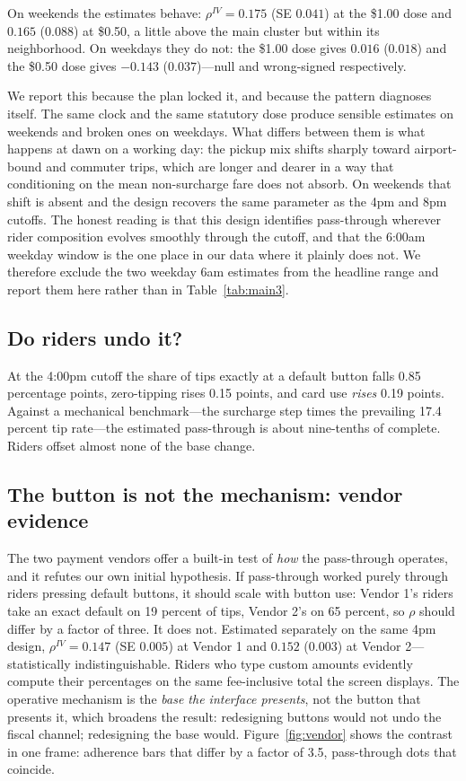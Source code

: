 On weekends the estimates behave: $\rho^{IV} = 0.175$ (SE $0.041$) at
the \$1.00 dose and $0.165$ ($0.088$) at \$0.50, a little above the
main cluster but within its neighborhood. On weekdays they do not: the
\$1.00 dose gives $0.016$ ($0.018$) and the \$0.50 dose gives $-0.143$
($0.037$)---null and wrong-signed respectively.

We report this because the plan locked it, and because the pattern
diagnoses itself. The same clock and the same statutory dose produce
sensible estimates on weekends and broken ones on weekdays. What differs
between them is what happens at dawn on a working day: the pickup mix
shifts sharply toward airport-bound and commuter trips, which are longer
and dearer in a way that conditioning on the mean non-surcharge fare
does not absorb. On weekends that shift is absent and the design
recovers the same parameter as the 4pm and 8pm cutoffs. The honest
reading is that this design identifies pass-through wherever rider
composition evolves smoothly through the cutoff, and that the 6:00am
weekday window is the one place in our data where it plainly does not.
We therefore exclude the two weekday 6am estimates from the headline
range and report them here rather than in Table~\ref{tab:main3}.

\subsection{Do riders undo it?}
At the 4:00pm cutoff the share of tips exactly at a default button falls
0.85 percentage points, zero-tipping rises 0.15 points, and card use
\emph{rises} 0.19 points. Against a mechanical benchmark---the surcharge
step times the prevailing 17.4 percent tip rate---the estimated
pass-through is about nine-tenths of complete. Riders offset almost none
of the base change.

\subsection{The button is not the mechanism: vendor evidence}
\label{sec:results-vendor}
The two payment vendors offer a built-in test of \emph{how} the
pass-through operates, and it refutes our own initial hypothesis. If
pass-through worked purely through riders pressing default buttons, it
should scale with button use: Vendor 1's riders take an exact default on
19 percent of tips, Vendor 2's on 65 percent, so $\rho$ should differ
by a factor of three. It does not. Estimated separately on the same 4pm
design, $\rho^{IV} = 0.147$ (SE $0.005$) at Vendor 1 and $0.152$
($0.003$) at Vendor 2---statistically indistinguishable. Riders who
type custom amounts evidently compute their percentages on the same
fee-inclusive total the screen displays. The operative mechanism is the
\emph{base the interface presents}, not the button that presents it,
which broadens the result: redesigning buttons would not undo the
fiscal channel; redesigning the base would. Figure~\ref{fig:vendor}
shows the contrast in one frame: adherence bars that differ by a factor
of 3.5, pass-through dots that coincide.

